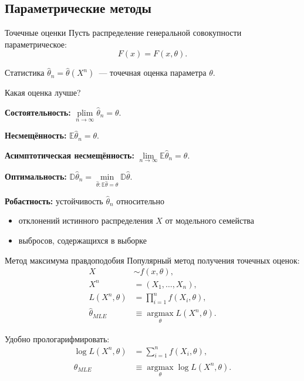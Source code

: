 \documentclass[9pt,pdf,utf8,hyperref={unicode},aspectratio=169]{beamer}
\DeclareMathOperator*{\plim}{\mathop{plim}}
\def\argmax#1{ \mathop{\text{argmax}}\limits_{#1} }
\begin{document}
\subsection{Параметрические методы}
\begin{frame}{Точечные оценки}
    Пусть распределение генеральной совокупности параметрическое:
    $$F(x) = F(x,\theta).$$

    Статистика $\hat{\theta}_n = \hat{\theta}\left(X^n\right)$~--- точечная оценка параметра $\theta$.

    Какая оценка лучше?

    \bigskip

    \textbf{Состоятельность:} $\plim\limits_{n\rightarrow\infty} \hat{\theta}_n  = \theta$.

    \textbf{Несмещённость:} $\mathbb{E}\hat{\theta}_n = \theta$.

    \textbf{Асимптотическая несмещённость:} $\lim\limits_{n\rightarrow\infty}\mathbb{E}\hat{\theta}_n = \theta$.

    \textbf{Оптимальность:} $\mathbb{D}\hat{\theta}_n = \min\limits_{\hat{\theta}\colon \mathbb{E}\hat{\theta}=\theta} \mathbb{D}\hat{\theta}$.

    \textbf{Робастность:} устойчивость $\hat{\theta}_n$ относительно 
    \begin{itemize}
    	\item отклонений истинного распределения $X$ от модельного семейства
    	\item выбросов, содержащихся в выборке
    \end{itemize}

\end{frame}

\begin{frame}{Метод максимума правдоподобия}
	Популярный метод получения точечных оценок:
	\begin{align*}
	X  &\sim f\left(x, \theta\right), \\
	X^n&=\left(X_1,\dots,X_n\right), \\
	L\left(X^n,\theta\right) &= \prod\limits_{i=1}^n f\left(X_i, \theta\right), \\
	\hat{\theta}_{MLE}&\equiv \argmax{\theta} L\left( X^n, \theta \right).
	\end{align*}
	
	\bigskip
	
	Удобно прологарифмировать:
	\begin{align*}
	\log L\left(X^n,\theta\right) &= \sum\limits_{i=1}^n f\left(X_i, \theta\right), \\
	\hat{\theta}_{MLE}&\equiv \argmax{\theta} \log L\left( X^n, \theta \right).
	\end{align*}
\end{frame}
\end{document}

